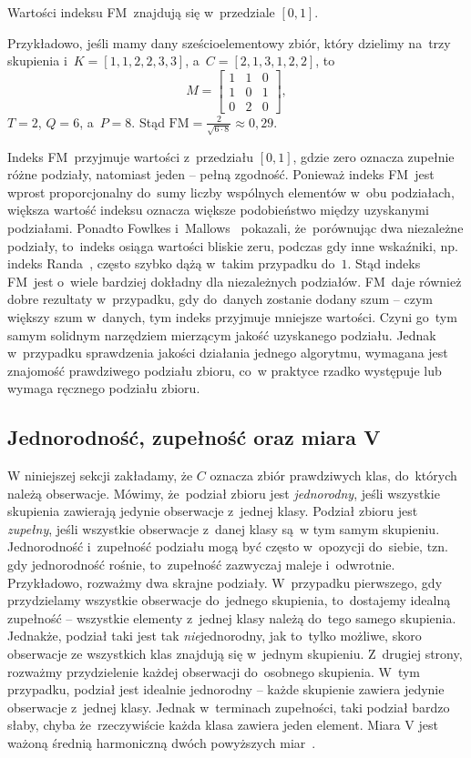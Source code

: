 \documentclass{praca1}
\begin{document}
Wartości indeksu FM~znajdują się w~przedziale $[0,1]$.

Przykładowo, jeśli mamy dany sześcioelementowy zbiór, który dzielimy na~trzy skupienia i~$K = [1, 1, 2, 2, 3, 3]$, a~$C = [2, 1, 3, 1, 2, 2]$, to~
$$
M = \begin{bmatrix}
      1 & 1 & 0 \\
      1 & 0 & 1 \\
      0 & 2 & 0
     \end{bmatrix},
$$
$T = 2$, $Q = 6$, a~$P = 8$. Stąd $\mathrm{FM} = \frac{2}{\sqrt{6\cdot 8}} \approx 0{,}29$.

Indeks FM~przyjmuje wartości z~przedziału $[0,1]$, gdzie zero oznacza zupełnie różne podziały, natomiast jeden -- pełną zgodność. Ponieważ indeks FM~jest wprost proporcjonalny do~sumy liczby wspólnych elementów w~obu podziałach, większa wartość indeksu oznacza większe podobieństwo między uzyskanymi podziałami. Ponadto Fowlkes i~Mallows~\cite{Fowlkes1983:fmindex} pokazali, że~porównując dwa niezależne podziały, to~indeks osiąga wartości bliskie zeru, podczas gdy inne wskaźniki, np. indeks Randa~\cite{Rand1971:objective}, często szybko dążą w~takim przypadku do~$1$. Stąd indeks FM~jest o~wiele bardziej dokładny dla niezależnych podziałów. FM~daje również dobre rezultaty w~przypadku, gdy do~danych zostanie dodany szum -- czym większy szum w~danych, tym indeks przyjmuje mniejsze wartości. Czyni go~tym samym solidnym narzędziem mierzącym jakość uzyskanego podziału. 
Jednak w~przypadku sprawdzenia jakości działania jednego algorytmu, wymagana jest znajomość prawdziwego podziału zbioru, co~w praktyce rzadko występuje lub wymaga ręcznego podziału zbioru.


\subsection{Jednorodność, zupełność oraz miara V}

W niniejszej sekcji zakładamy, że $C$ oznacza zbiór prawdziwych klas, do~których należą obserwacje. Mówimy, że~podział zbioru jest \emph{jednorodny}, jeśli wszystkie skupienia zawierają jedynie obserwacje z~jednej klasy. Podział zbioru jest \emph{zupełny}, jeśli wszystkie obserwacje z~danej klasy są~w tym samym skupieniu. Jednorodność i~zupełność podziału mogą być często w~opozycji do~siebie, tzn. gdy jednorodność rośnie, to~zupełność zazwyczaj maleje i~odwrotnie. Przykładowo, rozważmy dwa skrajne podziały. W~przypadku pierwszego, gdy przydzielamy wszystkie obserwacje do~jednego skupienia, to~dostajemy idealną zupełność -- wszystkie elementy z~jednej klasy należą do~tego samego skupienia. Jednakże, podział taki jest tak \emph{nie}jednorodny, jak to~tylko możliwe, skoro obserwacje ze wszystkich klas znajdują się w~jednym skupieniu. Z~drugiej strony, rozważmy przydzielenie każdej obserwacji do~osobnego skupienia. W~tym przypadku, podział jest idealnie jednorodny -- każde skupienie zawiera jedynie obserwacje z~jednej klasy. Jednak w~terminach zupełności, taki podział bardzo słaby, chyba że~rzeczywiście każda klasa zawiera jeden element. Miara $\textrm{V}$ jest ważoną średnią harmoniczną dwóch powyższych miar~\cite{Rosenberg2007:vmeasure}.
\end{document}
